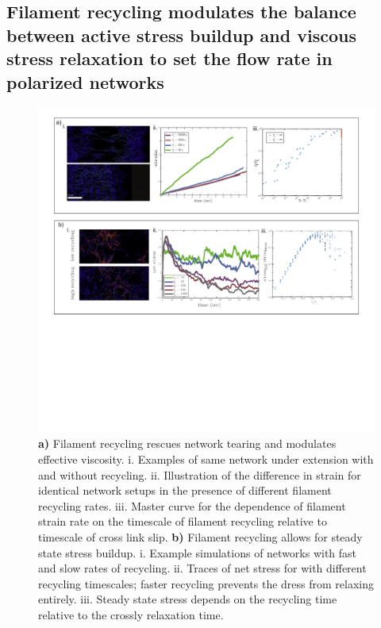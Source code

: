 \documentclass[10pt,letterpaper]{article}
\begin{document}
\subsection*{Filament recycling modulates the balance between active stress buildup and viscous stress relaxation to set the flow rate in polarized networks}


\begin{figure}[h!]
\centering
\includegraphics[width=\hsize]{figures/fig5/fig5}
\caption{\label{fig:recycle}  \textbf{a)} Filament recycling rescues network tearing and modulates effective viscosity. i. Examples of same network under extension with and without recycling. ii.  Illustration of the difference in strain for identical network setups in the presence of different filament recycling rates. iii. Master curve for the dependence of filament strain rate on the timescale of filament recycling relative to timescale of cross link slip.  \textbf{b)} Filament recycling allows for steady state stress buildup. i. Example simulations of networks with fast and slow rates of recycling. ii. Traces of net stress for with different recycling timescales; faster recycling prevents the dress from relaxing entirely.  iii. Steady state stress depends on the recycling time relative to the crossly relaxation time.}
\end{figure}
\end{document}

